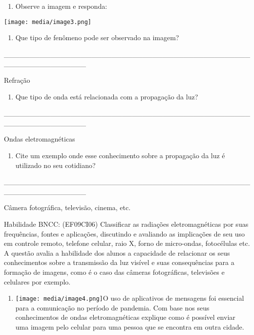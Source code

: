\begin{enumerate}
\def\labelenumi{\arabic{enumi}.}
\item
  Observe a imagem e responda:
\end{enumerate}

\texttt{[image: media/image3.png]}

\begin{enumerate}
\def\labelenumi{\alph{enumi})}
\item
  Que tipo de fenômeno pode ser observado na imagem?
\end{enumerate}

\_\_\_\_\_\_\_\_\_\_\_\_\_\_\_\_\_\_\_\_\_\_\_\_\_\_\_\_\_\_\_\_\_\_\_\_\_\_\_\_\_\_\_\_\_\_\_\_\_\_\_\_\_\_\_\_\_\_\_\_\_\_\_\_

Refração

\begin{enumerate}
\def\labelenumi{\alph{enumi})}
\item
  Que tipo de onda está relacionada com a propagação da luz?
\end{enumerate}

\_\_\_\_\_\_\_\_\_\_\_\_\_\_\_\_\_\_\_\_\_\_\_\_\_\_\_\_\_\_\_\_\_\_\_\_\_\_\_\_\_\_\_\_\_\_\_\_\_\_\_\_\_\_\_\_\_\_\_\_\_\_\_\_

Ondas eletromagnéticas

\begin{enumerate}
\def\labelenumi{\alph{enumi})}
\item
  Cite um exemplo onde esse conhecimento sobre a propagação da luz é
  utilizado no seu cotidiano?
\end{enumerate}

\_\_\_\_\_\_\_\_\_\_\_\_\_\_\_\_\_\_\_\_\_\_\_\_\_\_\_\_\_\_\_\_\_\_\_\_\_\_\_\_\_\_\_\_\_\_\_\_\_\_\_\_\_\_\_\_\_\_\_\_\_\_\_\_

Câmera fotográfica, televisão, cinema, etc.

\protect\hypertarget{_Hlk127700103}{}{}Habilidade BNCC: (EF09CI06)
Classificar as radiações eletromagnéticas por suas frequências, fontes e
aplicações, discutindo e avaliando as implicações de seu uso em controle
remoto, telefone celular, raio X, forno de micro-ondas, fotocélulas etc.
A questão avalia a habilidade dos alunos a capacidade de relacionar os
seus conhecimentos sobre a transmissão da luz visível e suas
consequências para a formação de imagens, como é o caso das câmeras
fotográficas, televisões e celulares por exemplo.

\begin{enumerate}
\def\labelenumi{\arabic{enumi}.}
\item
  \texttt{[image: media/image4.png]}O
  uso de aplicativos de mensagens foi essencial para a comunicação no
  período de pandemia. Com base nos seus conhecimentos de ondas
  eletromagnéticas explique como é possível enviar uma imagem pelo
  celular para uma pessoa que se encontra em outra cidade.
\end{enumerate}

